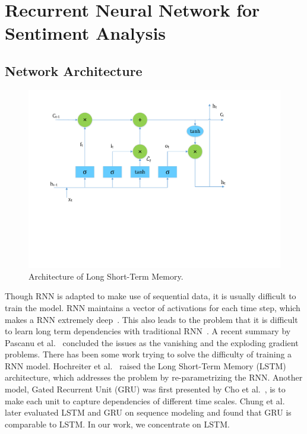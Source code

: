 \section{Recurrent Neural Network for Sentiment Analysis}\label{sec.rnn}

\subsection{Network Architecture}

\begin{figure}
\centering
\includegraphics[scale=0.5]{figure/lstm.pdf}
\caption{Architecture of Long Short-Term Memory.}
\label{fig:lstm}
\end{figure}

Though RNN is adapted to make use of sequential data, it is usually difficult to train the model. RNN maintains a vector of activations for each time step, which makes a RNN extremely deep~\cite{jozefowicz2015}. This also leads to the problem that it is difficult to learn long term dependencies with traditional RNN~\cite{bengio1994}. A recent summary by Pascanu et al.~\cite{pascanu2012} concluded the issues as the vanishing and the exploding gradient problems. There has been some work trying to solve the difficulty of training a RNN model. Hochreiter et al.~\cite{hochreiter1997} raised the Long Short-Term Memory (LSTM) architecture, which addresses the problem by re-parametrizing the RNN. Another model, Gated Recurrent Unit (GRU) was first presented by Cho et al.~\cite{cho2014}, is to make each unit to capture dependencies of different time scales. Chung et al.~\cite{chung2014} later evaluated LSTM and GRU on sequence modeling and found that GRU is comparable to LSTM. In our work, we concentrate on LSTM.

